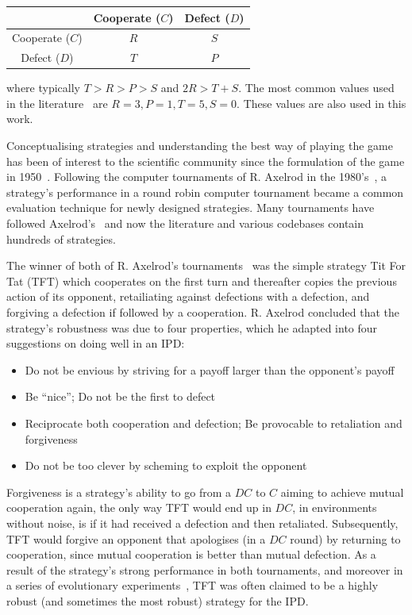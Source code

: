 \documentclass{article}
\begin{document}
\begin{center}
{\renewcommand{\arraystretch}{2}%
\begin{tabular}{c|c|c}
& Cooperate (\(C\)) & Defect (\(D\)) \\
\hline
Cooperate (\(C\)) & \(R\) & \(S\) \\
\hline
Defect (\(D\)) & \(T\) & \(P\) \\
\end{tabular}}
\end{center}

where typically \(T > R > P > S\) and \(2R > T + S\). The most common values used in
the literature~\cite{Axelrod1981} are $R=3, P=1, T=5, S=0$. These values are also
used in this work.

Conceptualising strategies and understanding the best way of playing the game
has been of interest to the scientific community since the formulation of the
game in 1950~\cite{Flood1958}. Following the computer tournaments of R. Axelrod in the
1980's~\cite{Axelrod1980a, Axelrod1980b}, a strategy's performance in a round
robin computer tournament became a common evaluation technique for newly designed
strategies. Many tournaments have followed Axelrod's~\cite{Beaufils1997, Bendor1991,
Harper2017, Kendall2007, Stephens2002, Stewart2012} and now the
literature and various codebases contain hundreds of strategies.

The winner of both of R. Axelrod's tournaments~\cite{Axelrod1980a, Axelrod1980b}
was the simple strategy Tit For Tat (TFT) which cooperates
on the first turn and thereafter copies the previous action of its opponent,
retailiating against defections with a defection, and forgiving a defection if followed
by a cooperation. R. Axelrod concluded that the strategy's robustness was due to four
properties, which he adapted into four suggestions on doing well in an IPD:

\begin{itemize}
    \item Do not be envious by striving for a payoff larger than the opponent's payoff
    \item Be ``nice''; Do not be the first to defect
    \item Reciprocate both cooperation and defection; Be provocable to retaliation and forgiveness
    \item Do not be too clever by scheming to exploit the opponent
\end{itemize}

Forgiveness is a strategy's ability to go from a \(DC\) to \(C\) aiming to achieve
mutual cooperation again, the only way TFT would end up in \(DC\), in
environments without noise, is if it had received a defection and then retaliated.
Subsequently, TFT would forgive an opponent that apologises (in a \(DC\) round)
by returning to cooperation, since mutual cooperation is better than mutual defection.
As a result of the strategy's strong performance in both tournaments, and moreover in a
series of evolutionary experiments~\cite{Axelrod1981}, TFT was often
claimed to be a highly robust (and sometimes the most robust) strategy for the IPD.
\end{document}
